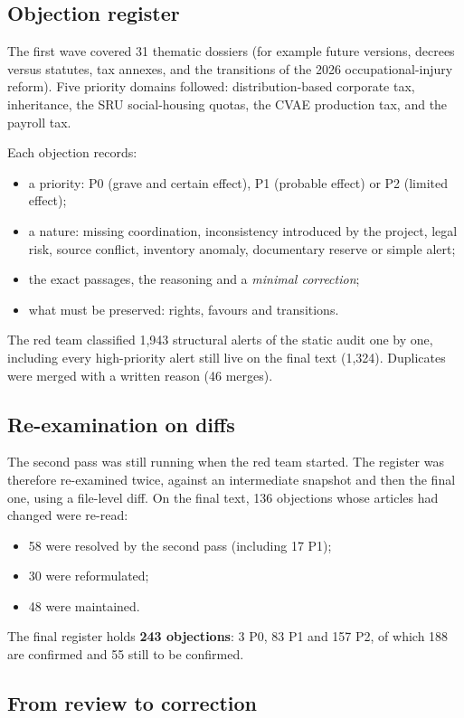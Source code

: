 \documentclass[11pt,a4paper]{article}
\begin{document}
\subsection{Objection register}

The first wave covered 31 thematic dossiers (for example future versions, decrees versus statutes, tax annexes, and the transitions of the 2026 occupational-injury reform). Five priority domains followed: distribution-based corporate tax, inheritance, the SRU social-housing quotas, the CVAE production tax, and the payroll tax.

Each objection records:
\begin{itemize}
  \item a priority: P0 (grave and certain effect), P1 (probable effect) or P2 (limited effect);
  \item a nature: missing coordination, inconsistency introduced by the project, legal risk, source conflict, inventory anomaly, documentary reserve or simple alert;
  \item the exact passages, the reasoning and a \emph{minimal correction};
  \item what must be preserved: rights, favours and transitions.
\end{itemize}
The red team classified 1{,}943 structural alerts of the static audit one by one, including every high-priority alert still live on the final text (1{,}324). Duplicates were merged with a written reason (46 merges).

\subsection{Re-examination on diffs}

The second pass was still running when the red team started. The register was therefore re-examined twice, against an intermediate snapshot and then the final one, using a file-level diff. On the final text, 136 objections whose articles had changed were re-read:
\begin{itemize}
  \item 58 were resolved by the second pass (including 17 P1);
  \item 30 were reformulated;
  \item 48 were maintained.
\end{itemize}
The final register holds \textbf{243 objections}: 3 P0, 83 P1 and 157 P2, of which 188 are confirmed and 55 still to be confirmed.

\subsection{From review to correction}
\end{document}
